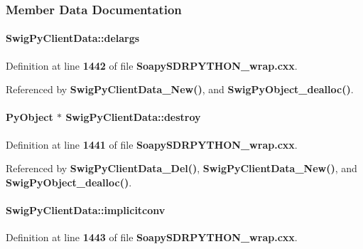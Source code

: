 \subsubsection{Member Data Documentation}
\paragraph[{delargs}]{ Swig\+Py\+Client\+Data\+::delargs}\label{structSwigPyClientData_a9cb4b9b02743d09dbe216f304e2b7df0}


Definition at line {\bf 1442} of file {\bf Soapy\+S\+D\+R\+P\+Y\+T\+H\+O\+N\+\_\+wrap.\+cxx}.



Referenced by {\bf Swig\+Py\+Client\+Data\+\_\+\+New()}, and {\bf Swig\+Py\+Object\+\_\+dealloc()}.

\paragraph[{destroy}]{\setlength{\rightskip}{0pt plus 5cm}Py\+Object $\ast$ Swig\+Py\+Client\+Data\+::destroy}\label{structSwigPyClientData_a1e3e0efca34cf915f74fdd66ecb9a01e}


Definition at line {\bf 1441} of file {\bf Soapy\+S\+D\+R\+P\+Y\+T\+H\+O\+N\+\_\+wrap.\+cxx}.



Referenced by {\bf Swig\+Py\+Client\+Data\+\_\+\+Del()}, {\bf Swig\+Py\+Client\+Data\+\_\+\+New()}, and {\bf Swig\+Py\+Object\+\_\+dealloc()}.

\paragraph[{implicitconv}]{ Swig\+Py\+Client\+Data\+::implicitconv}\label{structSwigPyClientData_a5f9ebdbc04a774559a64b926b6ec4070}


Definition at line {\bf 1443} of file {\bf Soapy\+S\+D\+R\+P\+Y\+T\+H\+O\+N\+\_\+wrap.\+cxx}.



